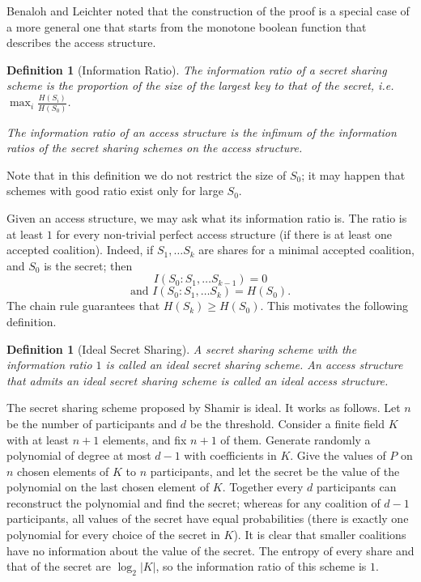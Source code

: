 \documentclass[11pt, a4paper]{kybernetika}
\newtheorem{definition}[theorem]{Definition}
\begin{document}
	Benaloh and Leichter \cite{benaloh1988generalized} noted that the construction of the proof is a special case of a more general one that starts from the monotone boolean function that describes the access structure. %
	
	\begin{definition}[Information Ratio]
		The \emph{information ratio of a secret sharing scheme} is the proportion of the size of the largest key to that of the secret, i.e. $\max_{i}\frac{H(S_i)}{H(S_0)}$.
		
		The \emph{information ratio of an access structure} is the infimum of the information ratios of the secret sharing schemes on the access structure.
	\end{definition}
	
	Note that in this definition we do not restrict the size of $S_0$; it may happen that schemes with good ratio exist only for large $S_0$. 
	
	Given an access structure, we may ask what its information ratio is. The ratio is at least $1$ for every non-trivial perfect access structure (if there is at least one accepted coalition). Indeed, if $S_1,\ldots S_k$ are shares for a minimal accepted coalition, and $S_0$ is the secret; then $$I(S_0:S_1,\ldots S_{k-1})=0$$ $$\text{and }I(S_0:S_1,\ldots S_k)=H(S_0).$$ The chain rule guarantees that $H(S_k)\ge H(S_0)$. This motivates the following definition.
	
	\begin{definition}[Ideal Secret Sharing]
		A secret sharing scheme with the information ratio $1$ is called an \emph{ideal} secret sharing scheme. An access structure that admits an ideal secret sharing scheme is called an \emph{ideal} access structure.
	\end{definition}
	
	The secret sharing scheme proposed by Shamir is ideal. It works as follows. 			
	Let $n$ be the number of participants and $d$ be the threshold. Consider a finite field $K$ with at least $n+1$ elements, and fix $n+1$ of them. Generate randomly a polynomial of degree at most $d-1$ with coefficients in $K$. Give the values of $P$ on $n$ chosen elements of $K$ to $n$ participants, and let the secret be the value of the polynomial on the last chosen element of $K$. Together every $d$ participants can reconstruct the polynomial and find the secret; whereas for any coalition of $d-1$ participants, all values of the secret have equal probabilities (there is exactly one polynomial for every choice of the secret in $K$). It is clear that smaller coalitions have no information about the value of the secret. The entropy of every share and that of the secret are $\log_2|K|$, so the information ratio of this scheme is $1$.
	
\end{document}
